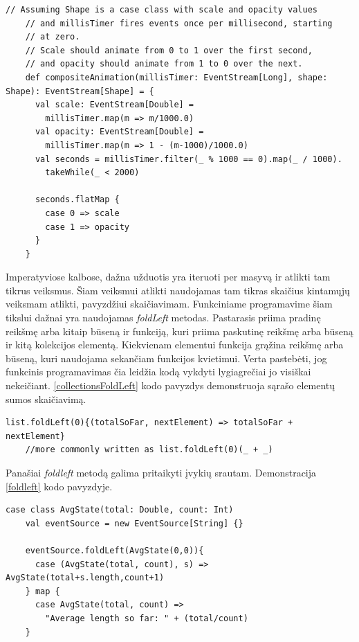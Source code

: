 \begin{lstlisting}[caption=- flatmap įvykių sraute, label=flatmap]
	// Assuming Shape is a case class with scale and opacity values
	// and millisTimer fires events once per millisecond, starting
	// at zero.
	// Scale should animate from 0 to 1 over the first second,
	// and opacity should animate from 1 to 0 over the next.
	def compositeAnimation(millisTimer: EventStream[Long], shape: Shape): EventStream[Shape] = {
	  val scale: EventStream[Double] =
	    millisTimer.map(m => m/1000.0)
	  val opacity: EventStream[Double] =
	    millisTimer.map(m => 1 - (m-1000)/1000.0)
	  val seconds = millisTimer.filter(_ % 1000 == 0).map(_ / 1000).
	    takeWhile(_ < 2000)
	  
	  seconds.flatMap {
	    case 0 => scale
	    case 1 => opacity
	  }
	}
\end{lstlisting}

Imperatyviose kalbose, dažna užduotis yra iteruoti per masyvą ir atlikti tam tikrus veiksmus. Šiam veiksmui atlikti naudojamas tam tikras skaičius kintamųjų veiksmam atlikti, pavyzdžiui skaičiavimam. Funkciniame programavime šiam tikslui dažnai yra naudojamas \textit{foldLeft} metodas. Pastarasis priima pradinę reikšmę arba kitaip būseną ir funkciją, kuri priima paskutinę reikšmę arba būseną ir kitą kolekcijos elementą. Kiekvienam elementui funkcija grąžina reikšmę arba būseną, kuri naudojama sekančiam funkcijos kvietimui. Verta pastebėti, jog funkcinis programavimas čia leidžia kodą vykdyti lygiagrečiai jo visiškai nekeičiant. \ref{collectionsFoldLeft} kodo pavyzdys demonstruoja sąrašo elementų sumos skaičiavimą.

\begin{lstlisting}[caption=- sąrašo elementų skaičiavimas naudojant flatmap, label=collectionsFoldLeft]
	list.foldLeft(0){(totalSoFar, nextElement) => totalSoFar + nextElement}
	//more commonly written as list.foldLeft(0)(_ + _)
\end{lstlisting}

Panašiai \textit{foldleft} metodą galima pritaikyti įvykių srautam. Demonstracija \ref{foldleft} kodo pavyzdyje.

\begin{lstlisting}[caption=- foldleft metodas įvykių sraute, label=foldleft]
	case class AvgState(total: Double, count: Int)
	val eventSource = new EventSource[String] {}
	
	eventSource.foldLeft(AvgState(0,0)){
      case (AvgState(total, count), s) => AvgState(total+s.length,count+1)
    } map {
      case AvgState(total, count) =>
        "Average length so far: " + (total/count)
    }
\end{lstlisting}

